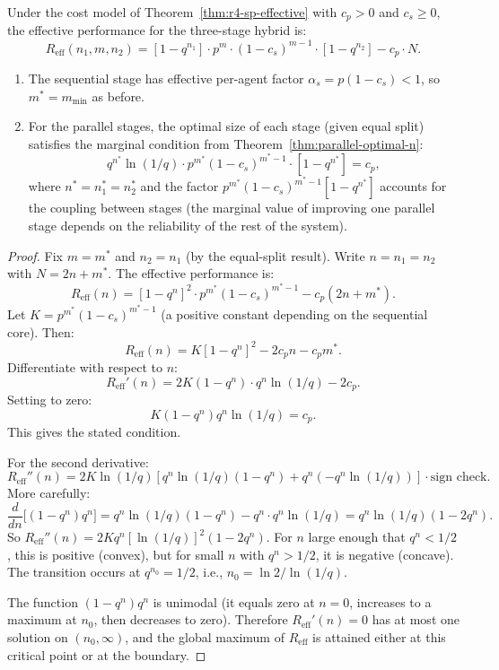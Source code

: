 \begin{theorem}
\label{thm:r4-optimal-allocation-cost}
Under the cost model of Theorem~\ref{thm:r4-sp-effective} with $c_p > 0$
and $c_s \ge 0$, the effective performance for the three-stage hybrid is:
\[
  R_{\mathrm{eff}}(n_1, m, n_2) = [1 - q^{n_1}] \cdot p^m \cdot (1-c_s)^{m-1}
  \cdot [1 - q^{n_2}] - c_p \cdot N.
\]
\begin{enumerate}
  \item The sequential stage has effective per-agent factor $\alpha_s = p(1-c_s) < 1$,
    so $m^* = m_{\min}$ as before.
  \item For the parallel stages, the optimal size of each stage (given equal split)
    satisfies the marginal condition from Theorem~\ref{thm:parallel-optimal-n}:
    \[
      q^{n^*} \ln(1/q) \cdot p^{m^*} (1-c_s)^{m^*-1}
      \cdot [1 - q^{n^*}] = c_p,
    \]
    where $n^* = n_1^* = n_2^*$ and the factor $p^{m^*}(1-c_s)^{m^*-1}[1-q^{n^*}]$
    accounts for the coupling between stages (the marginal value of improving one
    parallel stage depends on the reliability of the rest of the system).
\end{enumerate}
\end{theorem}

\begin{proof}
Fix $m = m^*$ and $n_2 = n_1$ (by the equal-split result).  Write
$n = n_1 = n_2$ with $N = 2n + m^*$.  The effective performance is:
\[
  R_{\mathrm{eff}}(n) = [1 - q^n]^2 \cdot p^{m^*} (1-c_s)^{m^*-1}
  - c_p(2n + m^*).
\]
Let $K = p^{m^*}(1-c_s)^{m^*-1}$ (a positive constant depending on the
sequential core).  Then:
\[
  R_{\mathrm{eff}}(n) = K[1-q^n]^2 - 2c_p n - c_p m^*.
\]
Differentiate with respect to $n$:
\[
  R_{\mathrm{eff}}'(n) = 2K(1-q^n) \cdot q^n \ln(1/q) - 2c_p.
\]
Setting to zero:
\[
  K(1-q^n) q^n \ln(1/q) = c_p.
\]
This gives the stated condition.

For the second derivative:
\[
  R_{\mathrm{eff}}''(n) = 2K\ln(1/q)\left[
    q^n \ln(1/q)(1-q^n) + q^n(-q^n \ln(1/q))
  \right]
  \cdot \text{sign check}.
\]
More carefully:
\[
  \frac{d}{dn}\bigl[(1-q^n)q^n\bigr]
  = q^n\ln(1/q)(1-q^n) - q^n \cdot q^n\ln(1/q)
  = q^n\ln(1/q)(1 - 2q^n).
\]
So $R_{\mathrm{eff}}''(n) = 2K q^n [\ln(1/q)]^2 (1 - 2q^n)$.
For $n$ large enough that $q^n < 1/2$, this is positive (convex), but for small $n$
with $q^n > 1/2$, it is negative (concave).  The transition occurs at
$q^{n_0} = 1/2$, i.e., $n_0 = \ln 2 / \ln(1/q)$.

The function $(1-q^n)q^n$ is unimodal (it equals zero at $n=0$, increases to a
maximum at $n_0$, then decreases to zero).  Therefore $R_{\mathrm{eff}}'(n) = 0$
has at most one solution on $(n_0, \infty)$, and the global maximum of
$R_{\mathrm{eff}}$ is attained either at this critical point or at the boundary.
\end{proof}

